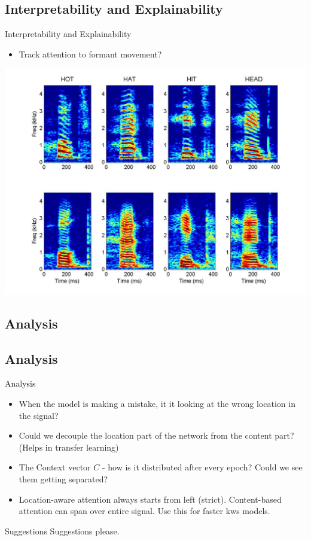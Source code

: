 \documentclass[10pt]{beamer}
\begin{document}
\subsection{Interpretability and Explainability}
\begin{frame}[fragile]{Interpretability and Explainability}

\begin{itemize}
	\item Track attention to formant movement?
\end{itemize}
\includegraphics[width=\linewidth, height=0.7\textheight]{formant.jpg}
\end{frame}

\subsection{Analysis}

\subsection{Analysis}
\begin{frame}[fragile]{Analysis}

\begin{itemize}
	\item When the model is making a mistake, it it looking at the wrong location in the signal?
	\item Could we decouple the location part of the network from the content part? (Helps in transfer learning)
	\item The Context vector $C$ - how is it distributed after every epoch? Could we see them getting separated?
	\item Location-aware attention always starts from left (strict). Content-based attention can span over entire signal. Use this for faster kws models.
\end{itemize}
\end{frame}

\begin{frame}[fragile]{Suggestions}
Suggestions please.
\end{frame}
\end{document}
